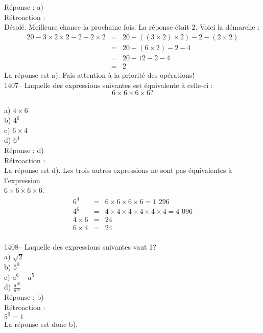 R\'eponse : a)\\

R\'etroaction :\\
D\'esol\'e. Meilleure chance la prochaine fois. La r\'eponse \'etait
2. Voici la d\'emarche :
\begin{eqnarray*}
20-3\times2\times2-2-2\times2 & = & 20-((3\times2)\times2)-2-(2\times2) \\ &
= & 20-(6\times2)-2-4 \\ & = & 20-12-2-4 \\ & = & 2
\end{eqnarray*}
La r\'eponse est a).
Fais attention \`a la priorit\'e des op\'erations!\\

1407-- Laquelle des expressions suivantes est \'equivalente \`a
celle-ci :
$$6\times6\times6\times6?$$\\
a) $4\times6$\\
b) $4^6$\\
c) $6\times4$\\
d) $6^4$\\

R\'eponse : d)\\

R\'etroaction :\\
La r\'eponse est d). Les trois autres expressions ne sont pas
\'equivalentes \`a l'expression\\
$6\times6\times6\times6$.
\begin{eqnarray*}
6^4&=&6\times6\times6\times6={\textrm{1 296}} \\ 4^6 &=&
4\times4\times4\times4\times4\times4={\textrm{4 096}}\\  4\times6 &=&24 \\
6\times4&=&24
\end{eqnarray*}\\

1408-- Laquelle des expressions suivantes vaut 1? \\
a) $\sqrt2$\\
b) $5^0$\\
c) $a^6-a^5$\\
d) {\large $\frac{a^{16}}{a{^{15}}}$}\\

R\'eponse : b)\\

R\'etroaction :\\
$5^0=1$\\
La r\'eponse est donc b).\\


